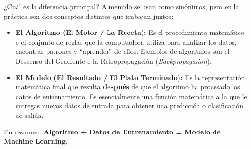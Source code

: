 ¿Cuál es la diferencia principal? A menudo se usan como sinónimos, pero en la práctica son dos conceptos distintos que trabajan juntos:

\begin{itemize}
    \item \textbf{El Algoritmo (El Motor / La Receta):} Es el procedimiento matemático o el conjunto de reglas que la computadora utiliza para analizar los datos, encontrar patrones y ``aprender'' de ellos. Ejemplos de algoritmos son el Descenso del Gradiente o la Retropropagación (\textit{Backpropagation}).
    \item \textbf{El Modelo (El Resultado / El Plato Terminado):} Es la representación matemática final que resulta \textbf{después} de que el algoritmo ha procesado los datos de entrenamiento. Es esencialmente una función matemática a la que le entregas nuevos datos de entrada para obtener una predicción o clasificación de salida.
\end{itemize}



En resumen: \textbf{Algoritmo + Datos de Entrenamiento = Modelo de Machine Learning.}

